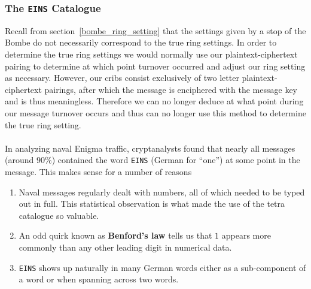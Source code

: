 \subsubsection{The \texttt{EINS} Catalogue}
Recall from section~\ref{bombe_ring_setting} that the settings given by a stop of the Bombe do not necessarily correspond to the true ring settings. In order to determine the true ring settings we would normally use our plaintext-ciphertext pairing to determine at which point turnover occurred and adjust our ring setting as necessary. However, our cribs consist exclusively of two letter plaintext-ciphertext pairings, after which the message is enciphered with the message key and is thus meaningless. Therefore we can no longer deduce at what point during our message turnover occurs and thus can no longer use this method to determine the true ring setting.
\\\\In analyzing naval Enigma traffic, cryptanalysts found that nearly all messages (around $90\%$) contained the word \texttt{EINS} (German for ``one'') at some point in the message. This makes sense for a number of reasons
\begin{enumerate}
	\item Naval messages regularly dealt with numbers, all of which needed to be typed out in full. This statistical observation is what made the use of the tetra catalogue so valuable.
	\item An odd quirk known as {\bf{Benford's law}} tells us that $1$ appears more commonly than any other leading digit in numerical data.
	\item \texttt{EINS} shows up naturally in many German words either as a sub-component of a word or when spanning across two words.
\end{enumerate}

